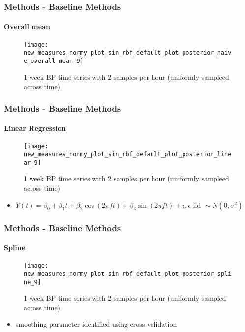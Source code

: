 \documentclass[
	8pt, %
]{beamer}
\begin{document}
\begin{frame}
	\frametitle{Methods - Baseline Methods}
	\framesubtitle{Overall mean}

		\begin{figure}
			\texttt{[image: new\_measures\_normy\_plot\_sin\_rbf\_default\_plot\_posterior\_naive\_overall\_mean\_9]}
			\caption{1 week BP time series with 2 samples per hour (uniformly sampleed across time)}
		\end{figure}

\end{frame}

%

\begin{frame}
	\frametitle{Methods - Baseline Methods}
	\framesubtitle{Linear Regression}
		\begin{figure}
			\texttt{[image: new\_measures\_normy\_plot\_sin\_rbf\_default\_plot\_posterior\_linear\_9]}
			\caption{1 week BP time series with 2 samples per hour (uniformly sampleed across time)}
		\end{figure}

	\begin{itemize}
		\item $Y(t) = \beta_0 + \beta_1 t + \beta_2 \cos(2 \pi f t) + \beta_3 \sin(2 \pi f t) + \epsilon, \epsilon \text{ iid } \sim N(0, \sigma^2)$
	\end{itemize}

\end{frame}

\begin{frame}
	\frametitle{Methods - Baseline Methods}
	\framesubtitle{Spline}
		\begin{figure}
			\texttt{[image: new\_measures\_normy\_plot\_sin\_rbf\_default\_plot\_posterior\_spline\_9]}
			\caption{1 week BP time series with 2 samples per hour (uniformly sampled across time)}
		\end{figure}

	\begin{itemize}
		\item smoothing parameter identified using cross validation
	\end{itemize}

\end{frame}
\end{document}

